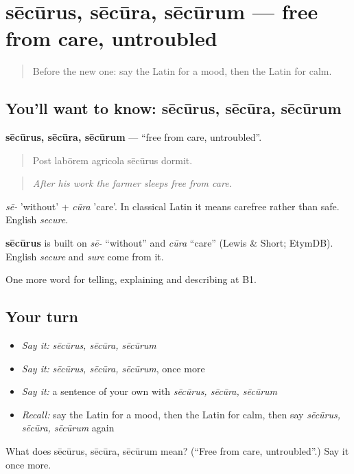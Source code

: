 \section[sēcūrus, sēcūra, sēcūrum]{sēcūrus, sēcūra, sēcūrum — free from care, untroubled}

\label{lesson:LA-C501-securus}



\begin{quote}
Before the new one: say the Latin for a mood, then the Latin for calm.
\end{quote}

\subsection*{You'll want to know: sēcūrus, sēcūra, sēcūrum}
\textbf{sēcūrus, sēcūra, sēcūrum} — \textquotedblleft{}free from care, untroubled\textquotedblright{}.

\begin{quote}
Post labōrem agricola sēcūrus dormit.
\end{quote}

\begin{quote}
\emph{After his work the farmer sleeps free from care.}
\end{quote}

\emph{sē-} 'without' + \emph{cūra} 'care'. In classical Latin it means carefree rather than safe. English \emph{secure}.

\begin{cousinweb}
\textbf{sēcūrus} is built on \emph{sē-} \textquotedblleft{}without\textquotedblright{} and \emph{cūra} \textquotedblleft{}care\textquotedblright{} (Lewis \& Short; EtymDB). English \emph{secure} and \emph{sure} come from it.
\end{cousinweb}

\begin{grammarlens}[title={What you've built}]
One more word for telling, explaining and describing at B1.
\end{grammarlens}

\subsection*{Your turn}
\begin{itemize}
\raggedright
  \item \emph{Say it:} \emph{sēcūrus, sēcūra, sēcūrum}
  \item \emph{Say it:} \emph{sēcūrus, sēcūra, sēcūrum}, once more
  \item \emph{Say it:} a sentence of your own with \emph{sēcūrus, sēcūra, sēcūrum}
  \item \emph{Recall:} say the Latin for a mood, then the Latin for calm, then say \emph{sēcūrus, sēcūra, sēcūrum} again
\end{itemize}

\begin{tcolorbox}[breakable,colback=teal!4,colframe=teal!35!black,title={Before you move on}]
What does sēcūrus, sēcūra, sēcūrum mean? (\textquotedblleft{}Free from care, untroubled\textquotedblright{}.) Say it once more.
\end{tcolorbox}
